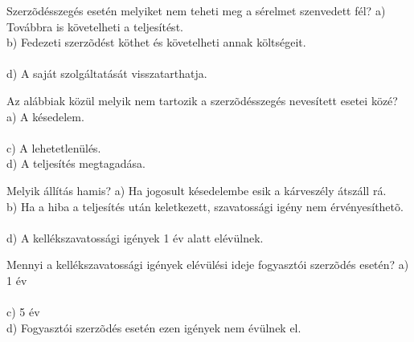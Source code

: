 \begin{frame}

\begin{tcolorbox}[title={160. Kérdés}]
Szerzõdésszegés esetén melyiket nem teheti meg a sérelmet szenvedett fél?
\tcblower
a) Továbbra is követelheti a teljesítést.\\
b) Fedezeti szerzõdést köthet és követelheti annak költségeit.\\
\\
d) A saját szolgáltatását visszatarthatja.
\end{tcolorbox}

\begin{tcolorbox}[title={161. Kérdés}]
Az alábbiak közül melyik nem tartozik a szerzõdésszegés nevesített esetei közé?
\tcblower
a) A késedelem.\\
\\
c) A lehetetlenülés.\\
d) A teljesítés megtagadása.
\end{tcolorbox}

\begin{tcolorbox}[title={162. Kérdés}]
Melyik állítás hamis?
\tcblower
a) Ha jogosult késedelembe esik a kárveszély átszáll rá.\\
b) Ha a hiba a teljesítés után keletkezett, szavatossági igény nem érvényesíthetõ.\\
\\
d) A kellékszavatossági igények 1 év alatt elévülnek.
\end{tcolorbox}

\begin{tcolorbox}[title={163. Kérdés}]
Mennyi a kellékszavatossági igények elévülési ideje fogyasztói szerzõdés esetén?
\tcblower
a) 1 év\\
\\
c) 5 év\\
d) Fogyasztói szerzõdés esetén ezen igények nem évülnek el.
\end{tcolorbox}

\end{frame}


